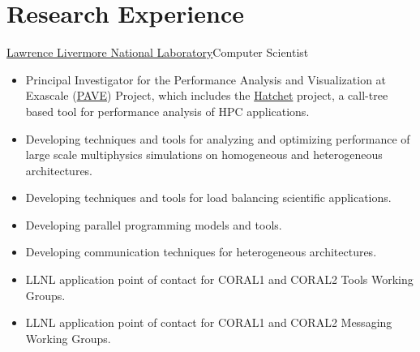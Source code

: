 \section{Research Experience}
		{\href{http://www.llnl.gov}{Lawrence Livermore National Laboratory}}{Computer Scientist}{}{}
		{\begin{itemize}
		\item Principal Investigator for the Performance Analysis and Visualization at Exascale (\href{https://computing.llnl.gov/projects/pave-performance-analysis-visualization-exascale}{PAVE}) Project,
          which includes the \href{https://hatchet.readthedocs.io/en/latest/}{Hatchet} project, a call-tree based tool for performance analysis of HPC applications.
		\item Developing techniques and tools for analyzing and optimizing performance of large scale multiphysics simulations on homogeneous and heterogeneous architectures.
		\item Developing techniques and tools for load balancing scientific applications.
		\item Developing parallel programming models and tools.
		\item Developing communication techniques for heterogeneous architectures.
		\item LLNL application point of contact for CORAL1 and CORAL2 Tools Working Groups.
		\item LLNL application point of contact for CORAL1 and CORAL2 Messaging Working Groups.
		\end{itemize}}

